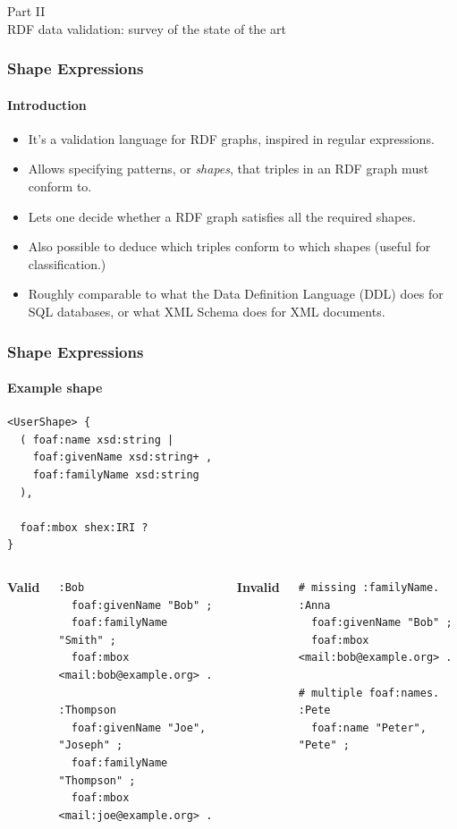 \documentclass{beamer}
\newcommand{\partslide}[2]{
  \begin{center}
    \LARGE{#1} \\
    \vspace{0.5cm}
    \huge{#2}
  \end{center}
}
\begin{document}
\begin{frame}
  \partslide{Part II}{RDF data validation: survey of the state of the art}
\end{frame}

\begin{frame}
  \frametitle{Shape Expressions}
  \framesubtitle{Introduction}

  \begin{itemize}
    \item It's a validation language for RDF graphs, inspired in regular
      expressions.

    \item Allows specifying patterns, or \textit{shapes}, that triples in an
      RDF graph must conform to.

    \item Lets one decide whether a RDF graph satisfies all the required shapes.

    \item Also possible to deduce which triples conform to which shapes (useful
      for classification.)

    \item Roughly comparable to what the Data Definition Language (DDL) does
      for SQL databases, or what XML Schema does for XML documents.
  \end{itemize}
\end{frame}

\begin{frame}[fragile]
  \frametitle{Shape Expressions}
  \framesubtitle{Example shape}

  \begin{Verbatim}
<UserShape> {
  ( foaf:name xsd:string |
    foaf:givenName xsd:string+ ,
    foaf:familyName xsd:string
  ),

  foaf:mbox shex:IRI ?
}
  \end{Verbatim}

  \pause

  \begin{columns}

    \textbf{Valid}

    \begin{Verbatim}[fontsize=\scriptsize]
:Bob
  foaf:givenName "Bob" ;
  foaf:familyName "Smith" ;
  foaf:mbox <mail:bob@example.org> .

:Thompson
  foaf:givenName "Joe", "Joseph" ;
  foaf:familyName "Thompson" ;
  foaf:mbox <mail:joe@example.org> .
    \end{Verbatim}

    \textbf{Invalid}

    \begin{Verbatim}[fontsize=\scriptsize, formatcom=\color{red}]
# missing :familyName.
:Anna
  foaf:givenName "Bob" ;
  foaf:mbox <mail:bob@example.org> .

# multiple foaf:names.
:Pete
  foaf:name "Peter", "Pete" ;
    \end{Verbatim}
  \end{columns}
\end{frame}
\end{document}
